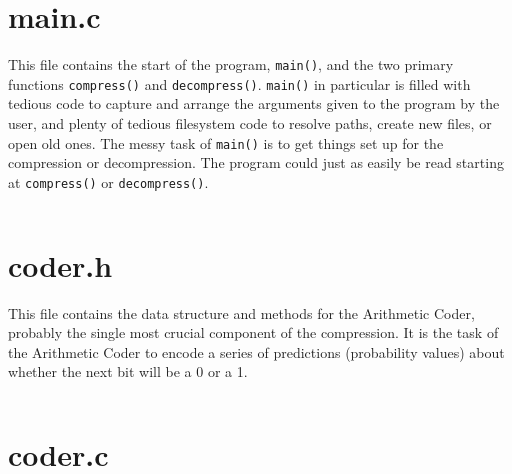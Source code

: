 \documentclass[10pt, fleqn]{article}
\theoremstyle{break}
\newcommand{\0}    {\mathbf{0}}
\numberwithin{equation}{section}
\begin{document}
\section{main.c}
\begin{snugshade}
This file contains the start of the program, {\tt main()}, and the two
primary functions {\tt compress()} and {\tt decompress()}.
{\tt main()} in particular is filled with tedious code to capture and
arrange the arguments given to the program by the user, and plenty of 
tedious filesystem code to resolve paths, create new files, or open old ones.
The messy task of {\tt main()} is to get things set up for the compression or 
decompression. The program could just
as easily be read starting at {\tt compress()} or {\tt decompress()}.
\end{snugshade}

\begin{multicols}{2}
\inputminted[mathescape,
               linenos,
               firstnumber=last,
               numbersep=5pt,
               gobble=0,
               frame=none,
               fontsize=\tiny,
               framesep=2mm]{c}{../main.c}
\end{multicols}

\pagebreak
\section{coder.h}
\begin{snugshade}
This file contains the data structure and methods for the Arithmetic Coder,
probably the single most crucial component of the compression. It is the task
of the Arithmetic Coder to encode a series of predictions (probability values)
about whether the next bit will be a 0 or a 1.
\end{snugshade}

\inputminted[mathescape,
               linenos,
               firstnumber=last,
               numbersep=5pt,
               gobble=0,
               frame=none,
               fontsize=\footnotesize,
               framesep=2mm]{c}{../coder.h}
\section{coder.c}
\begin{multicols}{2}
\inputminted[mathescape,
               linenos,
               firstnumber=last,
               numbersep=5pt,
               gobble=0,
               frame=none,
               fontsize=\tiny,
               framesep=2mm]{c}{../coder.c}
\end{multicols}
\end{document}
